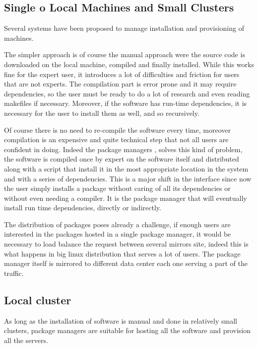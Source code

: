 \subsection{Single o Local Machines and Small Clusters} \label{subsec:soasmall}

Several systems have been proposed to manage installation and provisioning of
machines.

The simpler approach is of course the manual approach were the source code is
downloaded on the local machine, compiled and finally installed. While this
works fine for the expert user, it introduces a lot of difficulties and
friction for users that are not experts. The compilation part is error prone
and it may require dependencies, so the user must be ready to do a lot of
research and even reading makefiles if necessary. Moreover, if the software has
run-time dependencies, it is necessary for the user to install them as well,
and so recursively.

Of course there is no need to re-compile the software every time, moreover
compilation is an expensive and quite technical step that not all users are
confident in doing.  Indeed the package managers \cite{yum}, \cite{apt} solves
this kind of problem, the software is compiled once by expert on the software
itself and distributed along with a script that install it in the most
appropriate location in the system and with a series of dependencies. This is a
major shift in the interface since now the user simply installs a package
without caring of all its dependencies or without even needing a compiler. It
is the package manager that will eventually install run time dependencies,
directly or indirectly.

The distribution of packages poses already a challenge, if enough users are
interested in the packages hosted in a single package manager, it would be
necessary to load balance the request between several mirrors site, indeed this
is what happens in big linux distribution that serves a lot of users. The
package manager itself is mirrored to different data center each one serving a
part of the traffic.

\subsection{Local cluster} \label{subsec:soacluster}

As long as the installation of software is manual and done in relatively small
clusters, package managers are suitable for hosting all the software and
provision all the servers.

